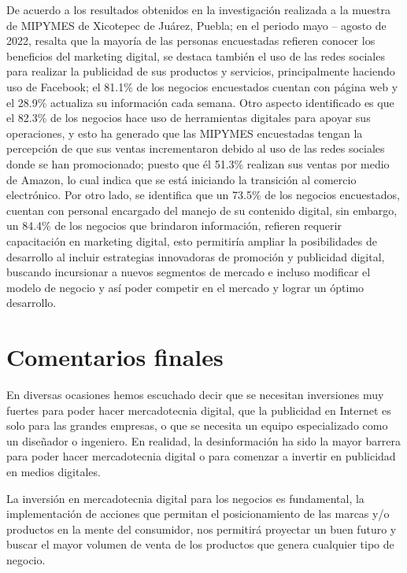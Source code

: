 \documentclass[12pt]{difu100cia} %
\begin{document}
De acuerdo a los resultados obtenidos en la investigación realizada a la muestra de MIPYMES de Xicotepec de Juárez, Puebla; en el periodo mayo – agosto de 2022, resalta que la mayoría de las personas encuestadas refieren conocer los beneficios del marketing digital, se destaca también el uso de las redes sociales para realizar la publicidad de sus productos y servicios, principalmente haciendo uso de Facebook; el 81.1\% de los negocios encuestados cuentan con página web y el 28.9\% actualiza su información cada semana. Otro aspecto identificado es que el 82.3\% de los negocios hace uso de herramientas digitales para apoyar sus operaciones, y esto ha generado que las MIPYMES encuestadas tengan la percepción de que sus ventas incrementaron debido al uso de las redes sociales donde se han promocionado; puesto que él 51.3\% realizan sus ventas por medio de Amazon, lo cual indica que se está iniciando la transición al comercio electrónico. Por otro lado, se identifica que un 73.5\% de los negocios encuestados, cuentan con personal encargado del manejo de su contenido digital, sin embargo, un 84.4\% de los negocios que brindaron información, refieren requerir capacitación en marketing digital, esto permitiría ampliar la posibilidades de desarrollo al incluir estrategias innovadoras de promoción y publicidad digital, buscando incursionar a nuevos segmentos de mercado e incluso modificar el modelo de negocio y así poder competir en el mercado y lograr un óptimo desarrollo.

\section{Comentarios finales}
\label{Comentarios finales}

En diversas ocasiones hemos escuchado decir que se necesitan inversiones muy fuertes para poder hacer mercadotecnia digital, que la publicidad en Internet es solo para las grandes empresas, o que se necesita un equipo especializado como un diseñador o ingeniero. En realidad, la desinformación ha sido la mayor barrera para poder hacer mercadotecnia digital o para comenzar a invertir en publicidad en medios digitales.

La inversión en mercadotecnia digital para los negocios es fundamental, la implementación de acciones que permitan el posicionamiento de las marcas y/o productos en la mente del consumidor, nos permitirá proyectar un buen futuro y buscar el mayor volumen de venta de los productos que genera cualquier tipo de negocio.
\end{document}
